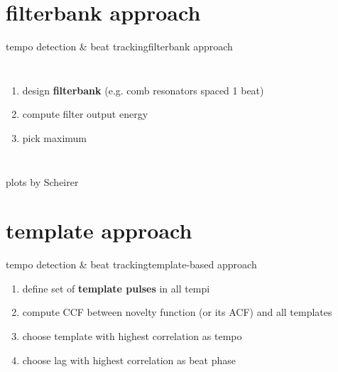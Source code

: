     \section{filterbank approach}
        \begin{frame}{tempo detection \& beat tracking}{filterbank approach}
            \begin{columns}[T]
                \begin{enumerate}
                    \item	design \textbf{filterbank} (e.g. comb resonators spaced 1 beat)
                    \item<2->	compute filter output energy	
                    \item<3->	pick maximum
                \end{enumerate}
            \end{columns}
            plots by Scheirer
        \end{frame}

    \section{template approach}
        \begin{frame}{tempo detection \& beat tracking}{template-based approach}
            \begin{enumerate}
                \item	define set of \textbf{template pulses} in all tempi
                \smallskip
                \item<1->	compute CCF between novelty function (or its ACF) and all templates
                \smallskip
                \item<1->	choose template with highest correlation as tempo
                \smallskip
                \item<1->	choose lag with highest correlation as beat phase
            \end{enumerate}
        \end{frame}

